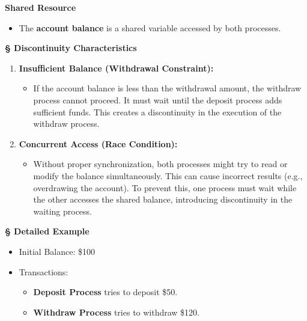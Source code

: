 \documentclass[a4paper]{book}
\newcommand{\sfbf}[1]{{\normalsize\textsf{\textbf{§ #1}}}}
\begin{document}
\textbf{Shared Resource}

\begin{itemize}
\item 
The \textbf{account balance} is a shared variable accessed by both processes.

\end{itemize}

\sfbf{Discontinuity Characteristics}

\begin{enumerate}
\item 
\textbf{Insufficient Balance (Withdrawal Constraint):}
\begin{itemize}
\item 
If the account balance is less than the withdrawal amount, the withdraw process cannot proceed. It must wait until the deposit process adds sufficient funds. This creates a discontinuity in the execution of the withdraw process.

\end{itemize}

\item 
\textbf{Concurrent Access (Race Condition):}
\begin{itemize}
\item 
Without proper synchronization, both processes might try to read or modify the balance simultaneously. This can cause incorrect results (e.g., overdrawing the account). To prevent this, one process must wait while the other accesses the shared balance, introducing discontinuity in the waiting process.

\end{itemize}

\end{enumerate}

\sfbf{Detailed Example}

\begin{itemize}
\item 
Initial Balance: \$100

\item 
Transactions:
\begin{itemize}
\item 
\textbf{Deposit Process} tries to deposit \$50.

\item 
\textbf{Withdraw Process} tries to withdraw \$120.

\end{itemize}

\end{itemize}
\end{document}
